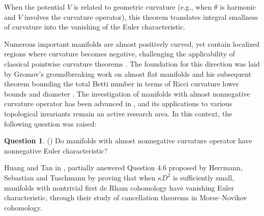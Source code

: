 \documentclass[12pt, twoside]{article}
\theoremstyle{definition}
\numberwithin{equation}{section}
\newtheorem*{question}{Question}
\begin{document}
When the potential $V$ is related to geometric curvature (e.g., when $\theta$ is harmonic and $V$ involves the curvature operator), this theorem translates integral smallness of curvature into the vanishing of the Euler characteristic. 

Numerous important manifolds are almost positively curved, yet contain localized regions where curvature becomes negative, challenging the applicability of classical pointwise curvature theorems \cite{Gromov1981,Ruh1982,Yamaguchi1991}. The foundation for this direction was laid by Gromov’s groundbreaking work on almost flat manifolds \cite{Gromov1978} and his subsequent theorem bounding the total Betti number in terms of Ricci curvature lower bounds and diameter \cite{Gromov1981}. The investigation of manifolds with almost nonnegative curvature operator has been advanced in \cite{Herrmann2013}, and its applications to various topological invariants remain an active research area. In this context, the following question was raised:
\begin{question}(\cite[Question 4.6]{Herrmann2013})
Do manifolds with almost nonnegative curvature operator have nonnegative Euler characteristic?
\end{question}
Huang and Tan in \cite{Huang2025}, partially answered Question 4.6 proposed by Herrmann, Sebastian and Tuschmann by proving that when $\kappa D^{2}$ is sufficiently small, manifolds with nontrivial first de Rham cohomology have vanishing Euler characteristic, through their study of cancellation theorems in Morse--Novikov cohomology. 
\end{document}
